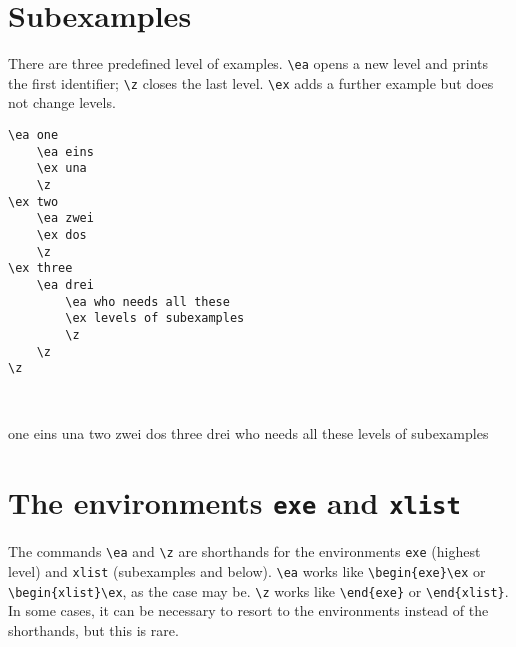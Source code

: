 \documentclass[output=paper]{langscibook}
\newcommand{\cmd}[1]{\texttt{\textbackslash#1}}
\newcommand{\env}[1]{\texttt{#1}}
\begin{document}
\section{Subexamples}
There are three predefined level of examples. \cmd{ea} opens a new level and prints the first identifier; \cmd{z} closes the last level. \cmd{ex} adds a further example but does not change levels. 

\begin{minipage}[t]{.5\textwidth}
\begin{lstlisting}
\ea one
    \ea eins
    \ex una
    \z
\ex two
    \ea zwei
    \ex dos
    \z
\ex three
    \ea drei
        \ea who needs all these
        \ex levels of subexamples
        \z
    \z
\z
 \end{lstlisting}
\end{minipage}~
\parbox[t]{.45\textwidth}{
\ea one
    \ea eins
    \ex una
    \z
\ex two
    \ea zwei
    \ex dos
    \z
\ex three
    \ea drei
        \ea who needs all these
        \ex levels of subexamples
        \z
    \z
\z
}

\section{The environments \texttt{exe} and \texttt{xlist}}
The commands \cmd{ea} and \cmd{z} are shorthands for the environments \env{exe} (highest level) and \env{xlist} (subexamples and below). \cmd{ea} works like \verb+\begin{exe}\ex+ or \verb+\begin{xlist}\ex+, as the case may be. \cmd{z} works like \verb+\end{exe}+ or \verb+\end{xlist}+. In some cases, it can be necessary to resort to the environments instead of the shorthands, but this is rare. 
\end{document}
